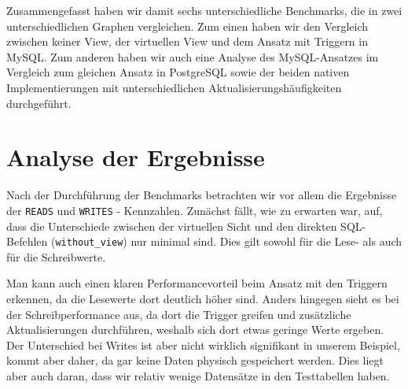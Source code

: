 Zusammengefasst haben wir damit sechs unterschiedliche Benchmarks, die in zwei unterschiedlichen Graphen vergleichen.
Zum einen haben wir den Vergleich zwischen keiner View, der virtuellen View und dem Ansatz mit Triggern in MySQL\@.
Zum anderen haben wir auch eine Analyse des MySQL-Ansatzes im Vergleich zum gleichen Ansatz in PostgreSQL sowie der beiden nativen Implementierungen mit unterschiedlichen Aktualisierungshäufigkeiten durchgeführt.

\newpage
\section{Analyse der Ergebnisse}\label{sec:analyse-der-ergebnisse}

Nach der Durchführung der Benchmarks betrachten wir vor allem die Ergebnisse der \texttt{READS} und \texttt{WRITES} - Kennzahlen.
Zunächst fällt, wie zu erwarten war, auf, dass die Unterschiede zwischen der virtuellen Sicht und den direkten SQL-Befehlen (\texttt{without\_view}) nur minimal sind.
Dies gilt sowohl für die Lese- als auch für die Schreibwerte.

Man kann auch einen klaren Performancevorteil beim Ansatz mit den Triggern erkennen, da die Lesewerte dort deutlich höher sind.
Anders hingegen sieht es bei der Schreibperformance aus, da dort die Trigger greifen und zusätzliche Aktualisierungen durchführen, weshalb sich dort etwas geringe Werte ergeben.
Der Unterschied bei Writes ist aber nicht wirklich signifikant in unserem Beispiel, kommt aber daher, da gar keine Daten physisch gespeichert werden.
Dies liegt aber auch daran, dass wir relativ wenige Datensätze in den Testtabellen haben.

